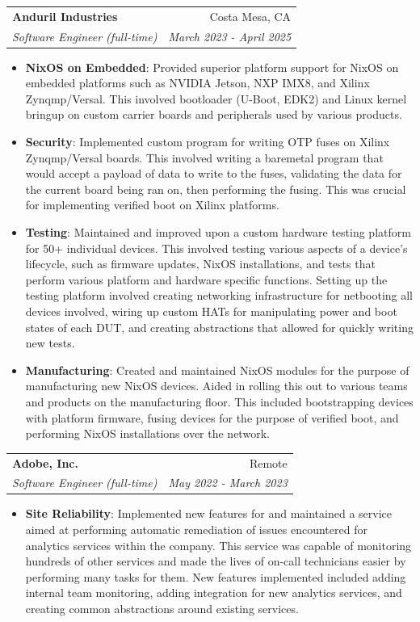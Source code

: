 \documentclass[a4paper,20pt]{article}
\makeatletter
\newcommand{\resumeItem}[2]{
\item\small{\textbf{#1}{: #2 \vspace{-2pt}}}}
\newcommand{\resumeSubheading}[4]{
  \vspace{-1pt}
\item
  \begin{tabular*}{0.97\textwidth}{l@{\extracolsep{\fill}}r}
    \textbf{#1} & #2 \\
    \textit{#3} & \textit{#4} \\
  \end{tabular*}\vspace{-5pt}
}
\newcommand{\resumeItemListStart}{
\begin{itemize}}
\newcommand{\resumeItemListEnd}{
\end{itemize}\vspace{-5pt}}
\makeatother
\begin{document}
\resumeSubheading{Anduril Industries}{Costa Mesa, CA}
{Software Engineer (full-time)}{March 2023 - April 2025}
\resumeItemListStart
\resumeItem{NixOS on Embedded}{Provided superior platform support for NixOS on
  embedded platforms such as NVIDIA Jetson, NXP IMX8, and Xilinx Zynqmp/Versal.
  This involved bootloader (U-Boot, EDK2) and Linux kernel bringup on custom
carrier boards and peripherals used by various products.}
\resumeItem{Security}{Implemented custom program for writing OTP fuses on
  Xilinx Zynqmp/Versal boards. This involved writing a baremetal program that
  would accept a payload of data to write to the fuses, validating the data for
  the current board being ran on, then performing the fusing. This was crucial
for implementing verified boot on Xilinx platforms.}
\resumeItem{Testing}{Maintained and improved upon a custom hardware testing
  platform for 50+ individual devices. This involved testing various
  aspects of a
  device's lifecycle, such as firmware updates, NixOS installations, and tests
  that perform various platform and hardware specific functions. Setting up the
  testing platform involved creating networking infrastructure for
  netbooting all
  devices involved, wiring up custom HATs for manipulating power and boot states
  of each DUT, and creating abstractions that allowed for quickly writing new
tests.}
\resumeItem{Manufacturing}{Created and maintained NixOS modules for the purpose
  of manufacturing new NixOS devices. Aided in rolling this out to various teams
  and products on the manufacturing floor. This included bootstrapping devices
  with platform firmware, fusing devices for the purpose of verified boot, and
performing NixOS installations over the network.}
\resumeItemListEnd

\resumeSubheading{Adobe, Inc.}{Remote}
{Software Engineer (full-time)}{May 2022 - March 2023}
\resumeItemListStart
\resumeItem{Site Reliability}{Implemented new features for and maintained a
  service aimed at performing automatic remediation of issues encountered for
  analytics services within the company. This service was capable of monitoring
  hundreds of other services and made the lives of on-call technicians easier by
  performing many tasks for them. New features implemented included adding
  internal team monitoring, adding integration for new analytics services, and
creating common abstractions around existing services.}
\resumeItemListEnd
\end{document}
